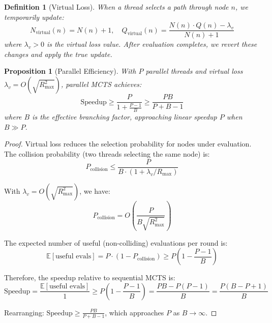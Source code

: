\documentclass[11pt,a4paper]{article}
\newtheorem{proposition}[theorem]{Proposition}
\newtheorem{definition}[theorem]{Definition}
\newcommand{\E}{\mathbb{E}}
\begin{document}
\begin{definition}[Virtual Loss]
When a thread selects a path through node $n$, we temporarily update:
\begin{equation}
    N_{\text{virtual}}(n) = N(n) + 1, \quad Q_{\text{virtual}}(n) = \frac{N(n) \cdot Q(n) - \lambda_v}{N(n) + 1}
\end{equation}
where $\lambda_v > 0$ is the virtual loss value. After evaluation completes, we revert these changes and apply the true update.
\end{definition}

\begin{proposition}[Parallel Efficiency]
\label{prop:parallel_mcts}
With $P$ parallel threads and virtual loss $\lambda_v = O(\sqrt{R_{\max}^2})$, parallel MCTS achieves:
\begin{equation}
    \text{Speedup} \geq \frac{P}{1 + \frac{P-1}{B}} \geq \frac{PB}{P + B - 1}
\end{equation}
where $B$ is the effective branching factor, approaching linear speedup $P$ when $B \gg P$.
\end{proposition}

\begin{proof}
Virtual loss reduces the selection probability for nodes under evaluation. The collision probability (two threads selecting the same node) is:
\begin{equation}
    P_{\text{collision}} \leq \frac{P}{B \cdot (1 + \lambda_v/R_{\max})}
\end{equation}

With $\lambda_v = O(\sqrt{R_{\max}^2})$, we have:
\begin{equation}
    P_{\text{collision}} = O\left(\frac{P}{B\sqrt{R_{\max}^2}}\right)
\end{equation}

The expected number of useful (non-colliding) evaluations per round is:
\begin{equation}
    \E[\text{useful evals}] = P \cdot (1 - P_{\text{collision}}) \geq P \left(1 - \frac{P-1}{B}\right)
\end{equation}

Therefore, the speedup relative to sequential MCTS is:
\begin{equation}
    \text{Speedup} = \frac{\E[\text{useful evals}]}{1} \geq P \left(1 - \frac{P-1}{B}\right) = \frac{PB - P(P-1)}{B} = \frac{P(B-P+1)}{B}
\end{equation}

Rearranging: $\text{Speedup} \geq \frac{PB}{P+B-1}$, which approaches $P$ as $B \to \infty$.
\end{proof}
\end{document}
